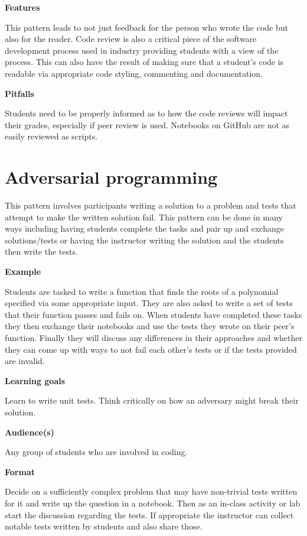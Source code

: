 \documentclass[]{book}
\begin{document}
\textbf{Features}

This pattern leads to not just feedback for the person who wrote the
code but also for the reader. Code review is also a critical piece of
the software development process used in industry providing students
with a view of the process. This can also have the result of making sure
that a student's code is readable via appropriate code styling,
commenting and documentation.

\textbf{Pitfalls}

Students need to be properly informed as to how the code reviews will
impact their grades, especially if peer review is used. Notebooks on
GitHub are not as easily reviewed as scripts.

\section{Adversarial programming}\label{adversarial-programming}

This pattern involves participants writing a solution to a problem and
tests that attempt to make the written solution fail. This pattern can
be done in many ways including having students complete the tasks and
pair up and exchange solutions/tests or having the instructor writing
the solution and the students then write the tests.

\textbf{Example}

Students are tasked to write a function that finds the roots of a
polynomial specified via some appropriate input. They are also asked to
write a set of tests that their function passes and fails on. When
students have completed these tasks they then exchange their notebooks
and use the tests they wrote on their peer's function. Finally they will
discuss any differences in their approaches and whether they can come up
with ways to not fail each other's tests or if the tests provided are
invalid.

\textbf{Learning goals}

Learn to write unit tests. Think critically on how an adversary might
break their solution.

\textbf{Audience(s)}

Any group of students who are involved in coding.

\textbf{Format}

Decide on a sufficiently complex problem that may have non-trivial tests
written for it and write up the question in a notebook. Then as an
in-class activity or lab start the discussion regarding the tests. If
appropriate the instructor can collect notable tests written by students
and also share those.
\end{document}
